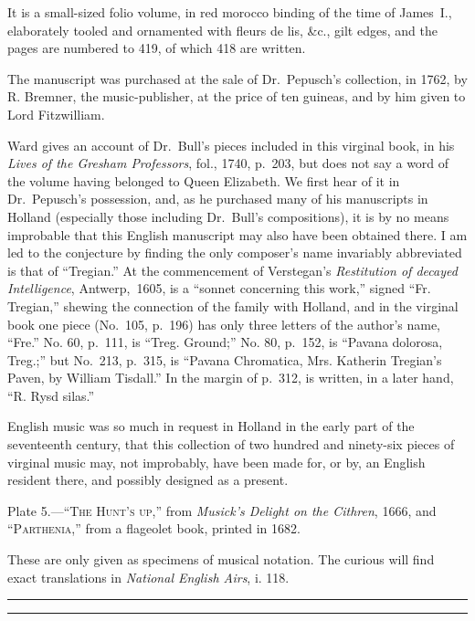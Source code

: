 It is a small-sized folio volume, in red morocco binding of the time of James~I.,
elaborately tooled and ornamented with fleurs de lis, \&c., gilt edges, and the pages
are numbered to 419, of which 418 are written.

The manuscript was purchased at the sale of Dr.~Pepusch’s collection, in 1762, by
R. Bremner, the music-publisher, at the price of ten guineas, and by him given to
Lord Fitzwilliam.

Ward gives an account of Dr.~Bull’s pieces included in this virginal book, in his
\textit{Lives of the Gresham Professors}, fol., 1740, p.~203, but does not say a word of the
volume having belonged to Queen Elizabeth. We first hear of it in Dr.~Pepusch’s
possession, and, as he purchased many of his manuscripts in Holland (especially those
including Dr.~Bull’s compositions), it is by no means improbable that this English
manuscript may also have been obtained there. I am led to the conjecture by finding 
the only composer’s name invariably abbreviated is that of “Tregian.” At the commencement \pagebreak 
of Verstegan’s \textit{Restitution of decayed Intelligence}, Antwerp,~1605, is a  
%
“sonnet concerning this work,” signed “Fr. Tregian,” shewing the connection of
the family with Holland, and in the virginal book one piece (No.~105, p.~196) has
only three letters of the author’s name, “Fre.” No. 60, p.~111, is “Treg. Ground;”
No. 80, p.~152, is “Pavana dolorosa, Treg.;” but No.~213, p.~315, is “Pavana
Chromatica, Mrs. Katherin Tregian’s Paven, by William Tisdall.” In the margin of
p.~312, is written, in a later hand, “R. Rysd silas.”

English music was so much in request in Holland in the early part of the seventeenth
century, that this collection of two hundred and ninety-six pieces of virginal
music may, not improbably, have been made for, or by, an English resident there,
and possibly designed as a present.

\bigskip
Plate 5.—“\textsc{The Hunt’s up},” from \textit{Musick's Delight on the Cithren}, 1666, and
“\textsc{Parth\-enia},” from a flageolet book, printed in 1682.

These are only given as specimens of musical notation. The curious will find exact
translations in \textit{National English Airs}, i. 118.
\normalsize

\vfill
{\hspace*{\fill}\rule{4em}{0.4pt}\rule{4em}{0.4pt}\hspace*{\fill}}
\vfill
\pagebreak